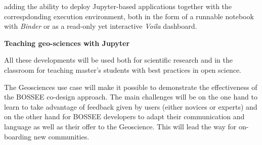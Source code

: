 \begin{task}[
  title=Geosciences application,
  id=geoscience,
  lead=UIO,
  PM=24,
  wphases={0-48},
  partners={UIO,QS,SRL}
]
\begin{compactitem}
  \item adding the ability to deploy Jupyter-based applications together with
    the correspdonding execution environment, both in the form of a runnable
    notebook with \emph{Binder} or as a read-only yet interactive \emph{Voila}
    dashboard.
\end{compactitem}

\textbf{Teaching geo-sciences with Jupyter}

  All these developments will be used both for scientific research and
  in the classroom for teaching master's students with best practices
  in open science.

  The Geosciences use case will make it possible to demonstrate the
  effectiveness of the BOSSEE co-design approach. The main challenges
  will be on the one hand to learn to take advantage of feedback given
  by users (either novices or experts) and on the other hand for
  BOSSEE developers to adapt their communication and language as well
  as their offer to the Geoscience. This will lead the way for
  on-boarding new communities.



\end{task}
